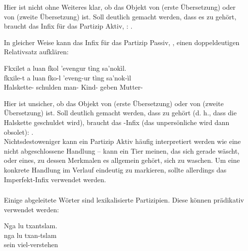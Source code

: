 \noindent Hier ist nicht ohne Weiteres klar, ob  das Objekt von  (erste Übersetzung) oder von  (zweite Übersetzung) ist. Soll deutlich gemacht werden, dass es zu  gehört, braucht  das Infix für das Partizip Aktiv, : .

In gleicher Weise kann das Infix für das Partizip Passiv, , einen doppeldeutigen Relativsatz aufklären:

\begin{interlin}
	\glll Fkxilet a luan fkol 'evengur tìng sa'nokìl. \\
	fkxile-t a luan fko-l 'eveng-ur tìng sa'nok-ìl \\
	Halskette-  schulden man- Kind- geben Mutter- \\
\end{interlin}

\noindent Hier ist unsicher, ob  das Objekt von  (erste Übersetzung) oder von  (zweite Übersetzung) ist. Soll deutlich gemacht werden, dass  zu  gehört (d. h., dass die Halskette geschuldet wird), braucht  das  -Infix (das unpersönliche  wird dann obsolet): . \\
\indent	Nichtsdestoweniger kann ein Partizip Aktiv häufig interpretiert werden wie eine nicht abgeschlossene Handlung --  kann ein Tier meinen, das sich gerade wäscht, oder eines, zu dessen Merkmalen es allgemein gehört, sich zu waschen. Um eine konkrete Handlung im Verlauf eindeutig zu markieren, sollte allerdings das Imperfekt-Infix  verwendet werden.

\subsubsection{} Einige abgeleitete Wörter sind lexikalisierte Partizipien. Diese  können prädikativ verwendet werden:

\begin{interlin}
	\glll \Npawl{}Nga lu txantslam. \\
	nga lu txan-tslam \\
	 sein viel-verstehen \\
\end{interlin}

